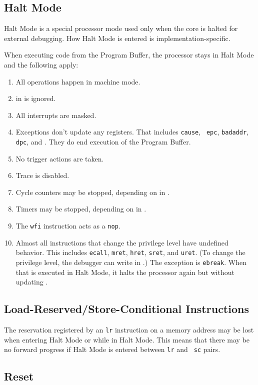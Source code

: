 \documentclass{article}
\newenvironment{steps}[1]
{
   \vspace{1ex}
   \noindent
   #1
   \begin{enumerate}[nosep]
}
{
   \end{enumerate}
   \vspace{1ex}
}
\begin{document}
\subsection{Halt Mode} \label{haltmode}

Halt Mode is a special processor mode used only when the core is halted for
external debugging. How Halt Mode is entered is implementation-specific.

\begin{steps}{When executing code from the Program Buffer, the processor stays
    in Halt Mode and the following apply:}
\item All operations happen in machine mode.
\item \Fmprv in \Rmstatus is ignored.
\item All interrupts are masked.
\item Exceptions don't update any registers.  That includes {\tt cause}, {\tt
    epc}, {\tt badaddr}, {\tt dpc}, and \Rmstatus. They do end execution of the
    Program Buffer.
\item No trigger actions are taken.
\item Trace is disabled.
\item Cycle counters may be stopped, depending on \Fstopcycle in \Rdcsr.
\item Timers may be stopped, depending on \Fstoptime in \Rdcsr.
\item The {\tt wfi} instruction acts as a {\tt nop}.
\item Almost all instructions that change the privilege level have undefined
    behavior.  This includes {\tt ecall}, {\tt mret}, {\tt hret}, {\tt sret},
    and {\tt uret}.  (To change the privilege level, the debugger can write
    \Fprv in \Rdcsr.) The exception is {\tt ebreak}. When that is executed in
    Halt Mode, it halts the processor again but without updating \Rdpc.
\end{steps}

\subsection{Load-Reserved/Store-Conditional Instructions}

The reservation registered by an {\tt lr} instruction on a memory address may
be lost when entering Halt Mode or while in Halt Mode.  This means that there
may be no forward progress if Halt Mode is entered between {\tt lr} and {\tt
sc} pairs.

\subsection{Reset}
\end{document}
